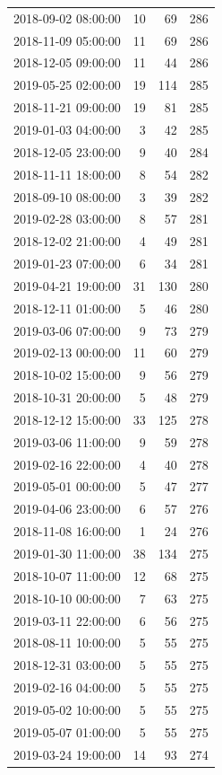 \begin{tabular}{lrrr}
2018-09-02 08:00:00 & 10 & 69 & 286 \\
2018-11-09 05:00:00 & 11 & 69 & 286 \\
2018-12-05 09:00:00 & 11 & 44 & 286 \\
2019-05-25 02:00:00 & 19 & 114 & 285 \\
2018-11-21 09:00:00 & 19 & 81 & 285 \\
2019-01-03 04:00:00 & 3 & 42 & 285 \\
2018-12-05 23:00:00 & 9 & 40 & 284 \\
2018-11-11 18:00:00 & 8 & 54 & 282 \\
2018-09-10 08:00:00 & 3 & 39 & 282 \\
2019-02-28 03:00:00 & 8 & 57 & 281 \\
2018-12-02 21:00:00 & 4 & 49 & 281 \\
2019-01-23 07:00:00 & 6 & 34 & 281 \\
2019-04-21 19:00:00 & 31 & 130 & 280 \\
2018-12-11 01:00:00 & 5 & 46 & 280 \\
2019-03-06 07:00:00 & 9 & 73 & 279 \\
2019-02-13 00:00:00 & 11 & 60 & 279 \\
2018-10-02 15:00:00 & 9 & 56 & 279 \\
2018-10-31 20:00:00 & 5 & 48 & 279 \\
2018-12-12 15:00:00 & 33 & 125 & 278 \\
2019-03-06 11:00:00 & 9 & 59 & 278 \\
2019-02-16 22:00:00 & 4 & 40 & 278 \\
2019-05-01 00:00:00 & 5 & 47 & 277 \\
2019-04-06 23:00:00 & 6 & 57 & 276 \\
2018-11-08 16:00:00 & 1 & 24 & 276 \\
2019-01-30 11:00:00 & 38 & 134 & 275 \\
2018-10-07 11:00:00 & 12 & 68 & 275 \\
2018-10-10 00:00:00 & 7 & 63 & 275 \\
2019-03-11 22:00:00 & 6 & 56 & 275 \\
2018-08-11 10:00:00 & 5 & 55 & 275 \\
2018-12-31 03:00:00 & 5 & 55 & 275 \\
2019-02-16 04:00:00 & 5 & 55 & 275 \\
2019-05-02 10:00:00 & 5 & 55 & 275 \\
2019-05-07 01:00:00 & 5 & 55 & 275 \\
2019-03-24 19:00:00 & 14 & 93 & 274 \\

\end{tabular}
